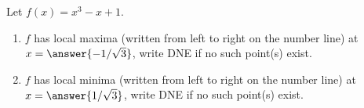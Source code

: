 \documentclass{ximera}
\author{Gregory Hartman \and Matthew Carr}
\begin{document}
\begin{exercise}






Let $f(x)=x^3-x+1$.
\begin{enumerate}
\item		$f$ has local maxima (written from left to right on the number line) at $x=\answer{-1/\sqrt{3}}$, write DNE if no such point(s) exist.
\item		$f$ has local minima (written from left to right on the number line) at $x=\answer{1/\sqrt{3}}$, write DNE if no such point(s) exist.
\end{enumerate}

\end{exercise}
\end{document}
